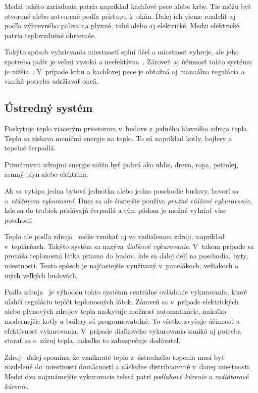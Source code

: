 Medzi takéto zariadenia patria napríklad kachľové pece alebo krby. 
Tie môžu byť otvorené alebo zatvorené podľa prístupu k~ohňu. 
Ďalej ich vieme rozdeliť aj podľa výhrevného paliva na plynné, tuhé alebo aj elektrické. 
Medzi elektrické patria teplovzdušné ohrievače.~\cite{vstajer2020elektricke}

Takýto spôsob vyhrievania miestností splní účel a miestnosť vyhreje, ale jeho spotreba palív je veľmi vysoká a neefektívna~\cite{pichova2012elektricke}. 
Zároveň aj účinnosť tohto systému je nižšia~\cite{pichova2012elektricke}. 
V~prípade krbu a kachľovej pece je obťažná aj manuálna regulácia a vzniká potreba udržiavať oheň.


\subsection{Ústredný systém}\label{central}
Poskytuje teplo viacerým priestorom v~budove z~jedného hlavného zdroja tepla. 
Teplo sa získava meničmi energie na teplo. 
To sú napríklad kotly, bojlery a tepelné čerpadlá.~\cite{centralHeating}

Primárnymi zdrojmi energie môžu byť palivá ako uhlie, drevo, ropa, petrolej, zemný plyn alebo elektrina.

Ak sa vytápa jedna bytová jednotka alebo jedno poschodie budovy, hovorí sa o~\emph{etážovom vykurovaní}. 
Dnes sa ale častejšie používa \emph{pružné etážové vykurovanie}, kde sa do trubiek pridávajú čerpadlá a tým pádom je možné vyhriať viac poschodí.~\cite{etaz}

Teplo ale podľa zdroja~\cite{teplarne} môže vznikať aj vo vzdialenom zdroji, napríklad v~teplárňach.
Takýto systém sa nazýva \emph{diaľkové vykurovanie}. 
V~takom prípade sa prenáša teplonosná látka priamo do budov, kde sa ďalej delí na poschodia, byty, miestnosti. 
Tento spôsob je najčastejšie využívaný v~panelákoch, vežiakoch a iných veľkých budovách.

Podľa zdroja~\cite{centralHeatingPlu} je výhodou tohto systému centrálne ovládanie vykurovania, ktoré uľahčí reguláciu teplôt teplonosných látok. 
Zároveň sa v~prípade elektrických alebo plynových zdrojov tepla naskytuje možnosť automatizácie, nakoľko modernejšie kotly a boilery sú programovateľné. 
To všetko zvyšuje účinnosť a efektívnosť vykurovania. 
V~prípade diaľkového vykurovania zaniká aj potreba starať sa o~zdroj tepla, nakoľko to zabezpečuje dodávateľ.

Zdroj~\cite{centralHeatingPlu} ďalej spomína, že vzniknuté teplo z~ústredného topenia musí byť rozdelené do~miestností domácností a následne distribuované v~danej miestnosti. 
Medzi dva najznámejšie vykurovacie telesá patrí \emph{podlahové kúrenie} a \emph{radiátorové kúrenie}.


